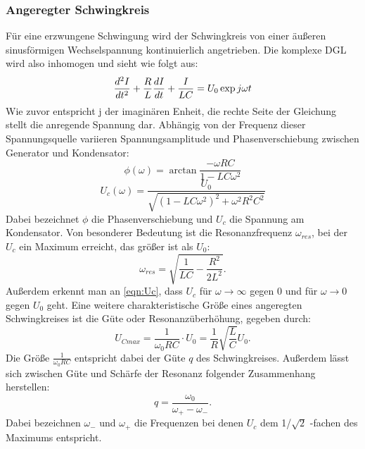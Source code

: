 \subsubsection{Angeregter Schwingkreis}
Für eine erzwungene Schwingung wird der Schwingkreis von einer äußeren
sinusförmigen
Wechselspannung kontinuierlich angetrieben.
Die komplexe DGL wird also inhomogen und sieht wie folgt aus:
\begin{equation}
  \centering
  \frac{d^2I}{dt^2} + \frac{R}{L} \frac{dI}{dt}
  + \frac{I}{LC} = U_0\exp{j\omega t}
  \label{eqn:Iinh}
\end{equation}
Wie zuvor entspricht j der imaginären Enheit, die rechte Seite der Gleichung
stellt die anregende Spannung dar.
Abhängig von der Frequenz dieser
Spannungsquelle variieren Spannungsamplitude und Phasenverschiebung zwischen
Generator und Kondensator:
\begin{equation}
  \phi(\omega) = \arctan{\frac{-\omega R C}{1 - LC\omega^2}}
  \label{eqn:phi}
\end{equation}
\begin{equation}
  U_c(\omega) = \frac{U_0}{\sqrt{(1 - LC\omega^2)^2 + \omega^2R^2C^2}}
  \label{eqn:Uc}
\end{equation}
Dabei bezeichnet $\phi$ die Phasenverschiebung und $U_c$ die Spannung am
Kondensator.
Von besonderer Bedeutung ist die Resonanzfrequenz $\omega_{res}$, bei der
$U_c$ ein Maximum erreicht, das größer ist als $U_0$:
\begin{equation}
  \omega_{res} = \sqrt{\frac{1}{LC} - \frac{R^2}{2L^2}}.
  \label{eqn:wres}
\end{equation}
Außerdem erkennt man an \ref{eqn:Uc}, dass $U_c$ für
$\omega \rightarrow \infty$ gegen 0 und für $\omega \rightarrow 0$ gegen $U_0$
geht.
Eine weitere charakteristische Größe eines angeregten Schwingkreises ist die
Güte oder Resonanzüberhöhung, gegeben durch:
\begin{equation}
  U_{Cmax} = \frac{1}{\omega_0 R C} \cdot U_0 = \frac{1}{R}\sqrt{\frac{L}{C}}U_0.
  \label{eqn:güte1}
\end{equation}
Die Größe $\frac{1}{\omega_0 R C}$ entspricht dabei der Güte $q$ des Schwingkreises.
Außerdem lässt sich zwischen Güte und Schärfe der Resonanz folgender
Zusammenhang herstellen:
\begin{equation}
  q = \frac{\omega_0}{\omega_+ - \omega_-}.
  \label{eqn:güte2}
\end{equation}
Dabei bezeichnen $\omega_-$ und $\omega_+$ die Frequenzen bei denen $U_c$ dem
1/$\sqrt{2}$ -fachen des Maximums entspricht.
